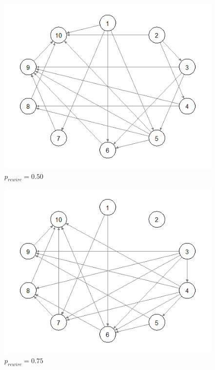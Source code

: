 \documentclass{article}
\begin{document}
\begin{figure}
\centering
\includegraphics[width=1\textwidth]{p50.png}
\caption{\label{fig:p50}$p_{rewire}=0.50$}
\end{figure}

\begin{figure}
\centering
\includegraphics[width=1\textwidth]{p75.png}
\caption{\label{fig:p75}$p_{rewire}=0.75$}
\end{figure}
\end{document}
